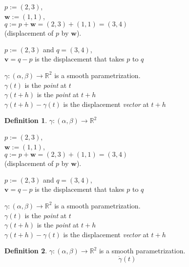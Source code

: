 \documentclass[twocolumn,20pt,fleqn]{extarticle}
\newcommand{\sep}{\vspace{0.5cm}}
\theoremstyle{plain}
\theoremstyle{definition}
\newtheorem*{definition}{Definition}
\theoremstyle{remark}
\begin{document}
\clearpage



$p := (2,3)$,\\ $\mathbf{w} := (1,1)$,\\ $q:=p + \mathbf{w} = (2,3) + (1,1) = (3,4)$ \\ (displacement of $p$ by $\mathbf{w}$).

\sep
$p := (2,3)$ and $q=(3,4)$,\\
$\mathbf{v}= q - p$ is the displacement that takes $p$ to $q$ 
\sep

$\gamma : (\alpha,\beta) \to \mathbb{R}^2$ is a smooth parametrization.\\
$\gamma(t)$ is the \emph{point} at $t$\\
$\gamma(t+h)$ is the \emph{point} at $t+h$\\
$\gamma(t+h)-\gamma(t)$ is the displacement \emph{vector} at $t+h$\\



\begin{definition}
$\gamma : (\alpha,\beta) \to \mathbb{R}^2$\end{definition}


\clearpage



$p := (2,3)$,\\ $\mathbf{w} := (1,1)$,\\ $q:=p + \mathbf{w} = (2,3) + (1,1) = (3,4)$ \\ (displacement of $p$ by $\mathbf{w}$).

\sep
$p := (2,3)$ and $q=(3,4)$,\\
$\mathbf{v}= q - p$ is the displacement that takes $p$ to $q$ 
\sep

$\gamma : (\alpha,\beta) \to \mathbb{R}^2$ is a smooth parametrization.\\
$\gamma(t)$ is the \emph{point} at $t$\\
$\gamma(t+h)$ is the \emph{point} at $t+h$\\
$\gamma(t+h)-\gamma(t)$ is the displacement \emph{vector} at $t+h$\\



\begin{definition}
$\gamma : (\alpha,\beta) \to \mathbb{R}^2$ is a smooth parametrization.
\[\dot{\gamma}(t) \]\end{definition}


\clearpage
\end{document}
